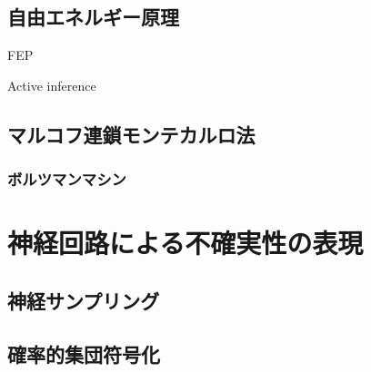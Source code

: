 \documentclass[titlepage]{ltjsbook}
\begin{document}
\subsection{自由エネルギー原理}
FEP

Active inference

\subsection{マルコフ連鎖モンテカルロ法}
\subsubsection{ボルツマンマシン}

\section{神経回路による不確実性の表現}
\subsection{神経サンプリング}

\subsection{確率的集団符号化}

\printbibliography[segment=\therefsegment,heading=subbibliography,title={参考文献}]
\end{document}

